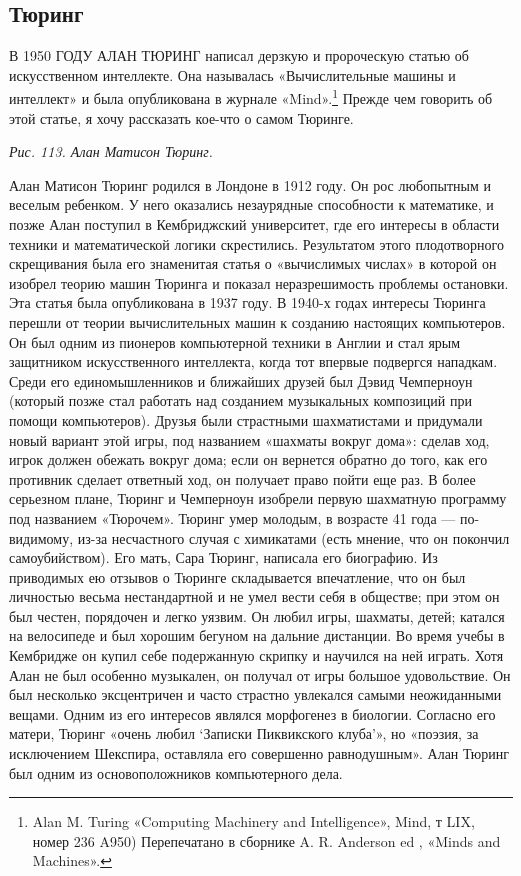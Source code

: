 \documentclass[../main.tex]{subfiles}
\begin{document}

\subsection{Тюринг}

В 1950 ГОДУ АЛАН ТЮРИНГ написал дерзкую и пророческую статью об искусственном интеллекте. Она называлась «Вычислительные машины и интеллект» и была опубликована в журнале «Mind».\footnote{Alan M. Turing «Computing Machinery and Intelligence», Mind, т LIX, номер 236 A950) Перепечатано в сборнике A. R. Anderson ed , «Minds and Machines».} Прежде чем говорить об этой статье, я хочу рассказать кое-что о самом Тюринге.

\emph{Рис. 113. Алан Матисон Тюринг.}

Алан Матисон Тюринг родился в Лондоне в 1912 году. Он рос любопытным и веселым ребенком. У него оказались незаурядные способности к математике, и позже Алан поступил в Кембриджский университет, где его интересы в области техники и математической логики скрестились. Результатом этого плодотворного скрещивания была его знаменитая статья о «вычислимых числах» в которой он изобрел теорию машин Тюринга и показал неразрешимость проблемы остановки. Эта статья была опубликована в 1937 году. В 1940-х годах интересы Тюринга перешли от теории вычислительных машин к созданию настоящих компьютеров. Он был одним из пионеров компьютерной техники в Англии и стал ярым защитником искусственного интеллекта, когда тот впервые подвергся нападкам. Среди его единомышленников и ближайших друзей был Дэвид Чемперноун (который позже стал работать над созданием музыкальных композиций при помощи компьютеров). Друзья были страстными шахматистами и придумали новый вариант этой игры, под названием «шахматы вокруг дома»: сделав ход, игрок должен обежать вокруг дома; если он вернется обратно до того, как его противник сделает ответный ход, он получает право пойти еще раз. В более серьезном плане, Тюринг и Чемперноун изобрели первую шахматную программу под названием «Тюрочем». Тюринг умер молодым, в возрасте 41 года --- по-видимому, из-за несчастного случая с химикатами (есть мнение, что он покончил самоубийством). Его мать, Сара Тюринг, написала его биографию. Из приводимых ею отзывов о Тюринге складывается впечатление, что он был личностью весьма нестандартной и не умел вести себя в обществе; при этом он был честен, порядочен и легко уязвим. Он любил игры, шахматы, детей; катался на велосипеде и был хорошим бегуном на дальние дистанции. Во время учебы в Кембридже он купил себе подержанную скрипку и научился на ней играть. Хотя Алан не был особенно музыкален, он получал от игры большое удовольствие. Он был несколько эксцентричен и часто страстно увлекался самыми неожиданными вещами. Одним из его интересов являлся морфогенез в биологии. Согласно его матери, Тюринг «очень любил \enquote*{Записки Пиквикского клуба}», но «поэзия, за исключением Шекспира, оставляла его совершенно равнодушным». Алан Тюринг был одним из основоположников компьютерного дела.
\end{document}
